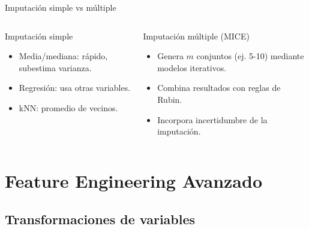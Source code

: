 \documentclass[aspectratio=169, 10pt, xcolor=table]{beamer}
\begin{document}
\begin{frame}{Imputación simple vs múltiple}
    \begin{columns}[t]
        \begin{block}{Imputación simple}
            \begin{itemize}
                \item Media/mediana: rápido, subestima varianza.
                \item Regresión: usa otras variables.
                \item kNN: promedio de vecinos.
            \end{itemize}
        \end{block}
        \begin{block}{Imputación múltiple (MICE)}
            \begin{itemize}
                \item Genera $m$ conjuntos (ej. 5-10) mediante modelos iterativos.
                \item Combina resultados con reglas de Rubin.
                \item Incorpora incertidumbre de la imputación.
            \end{itemize}
        \end{block}
    \end{columns}
\end{frame}

\section{Feature Engineering Avanzado}

\subsection{Transformaciones de variables}
\end{document}
